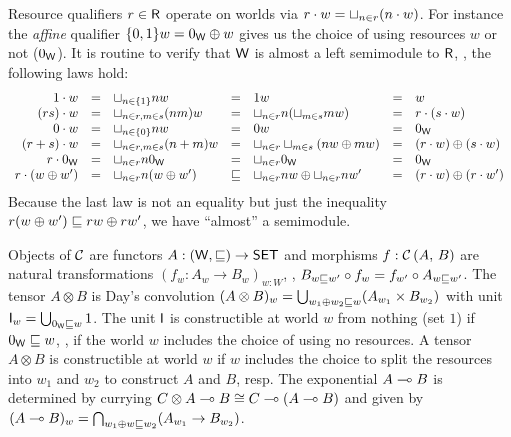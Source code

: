 \documentclass[acmsmall,review,anonymous]{acmart}\settopmatter{printfolios=true,printccs=false,printacmref=false}
\begin{document}
Resource qualifiers $r \in \mathsf{R}$ operate on worlds via
$r \cdot w = \sqcup_{n \in r} (n \cdot w)$.
%
For instance the \emph{affine} qualifier $\{0,1\}w = 0_{\mathsf{W}} \oplus w$
gives us the choice of using resources $w$ or not ($0_{\mathsf{W}}$).
%
It is routine to verify that $\mathsf{W}$ is almost a left semimodule to $\mathsf{R}$,
\ie, the following laws hold:
\[
\begin{array}{rclclcl}
  1 \cdot w
    & = & \sqcup_{n \in \{1\}} nw
    & = & 1w
    & = & w
\\
  (rs) \cdot w
    & = & \sqcup_{n \in r, m \in s} (nm)w
    & = & \sqcup_{n \in r} n(\sqcup_{m \in s} mw)
    & = & r \cdot (s \cdot w)
\\
  0 \cdot w
    & = & \sqcup_{n \in \{0\}} nw
    & = & 0w
    & = & 0_{\mathsf{W}}
\\
  (r + s) \cdot w
    & = & \sqcup_{n \in r, m \in s} (n+m)w
    & = & \sqcup_{n \in r} \sqcup_{m \in s} (nw \oplus mw)
    & = & (r \cdot w) \oplus (s \cdot w)
\\
  r \cdot 0_{\mathsf{W}}
    & = & \sqcup_{n \in r} n0_{\mathsf{W}}
    & = & \sqcup_{n \in r} 0_{\mathsf{W}}
    & = & 0_{\mathsf{W}}
\\
  r \cdot (w \oplus w')
    & = & \sqcup_{n \in r} n(w \oplus w')
    & \sqsubseteq & \sqcup_{n \in r} nw \oplus \sqcup_{n \in r} nw'
    & = & (r \cdot w) \oplus (r \cdot w')
\\
\end{array}
\]
Because the last law is not an equality but just the inequality
$r (w \oplus w') \sqsubseteq rw \oplus rw'$, we have ``almost'' a
semimodule.

Objects of $\mathcal{C}$ are functors $A : (\mathsf{W},\sqsubseteq) \to \mathsf{SET}$ and morphisms
$f : \mathcal{C}\,(A,\,B)$ are natural transformations
$(f_w : A_w \to B_w)_{w:W}$, \ie,
$B_{w \sqsubseteq w'} \circ f_w = f_{w'} \circ A_{w \sqsubseteq w'}$.  The tensor
$A \otimes B$ is Day's convolution
$(A \otimes B)_w = \bigcup_{w_1 \oplus w_2 \sqsubseteq w} (A_{w_1} \times B_{w_2})$
with unit $\mathsf{I}_w = \bigcup_{0_{\mathsf{W}} \sqsubseteq w} 1$.  The unit $\mathsf{I}$ is
constructible at world $w$ from nothing (set $1$) if $0_{\mathsf{W}} \sqsubseteq w$,
\ie, if the world $w$ includes the choice of using no resources.  A
tensor $A \otimes B$ is constructible at world $w$ if $w$ includes the
choice to split the resources into $w_1$ and $w_2$ to construct $A$
and $B$, resp.  The exponential $A \multimap B$ is determined by currying
$C \otimes A \multimap B \cong C \multimap (A \multimap B)$ and given by
$(A \multimap B)_w = \bigcap_{w_1 \oplus w \sqsubseteq w_2} (A_{w_1} \to
B_{w_2})$.
\end{document}

